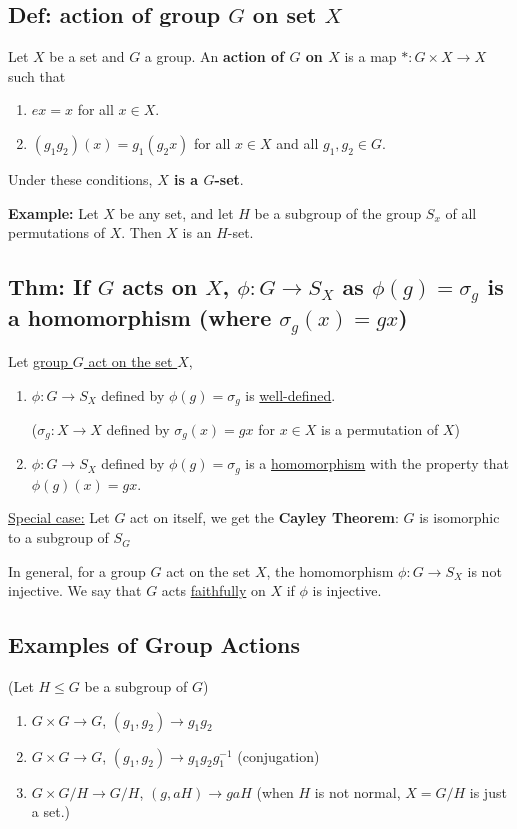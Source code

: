 \documentclass[11pt]{elegantbook}
\begin{document}
\subsection{Def: action of group $G$ on set $X$}
\begin{definition}
    Let $X$ be a set and $G$ a group. An \textbf{action of $G$ on $X$} is a map $*:G\times X \rightarrow	X$ such that
    \begin{enumerate}[(1)]
        \item $ex=x$ for all $x\in X$.
        \item $(g_1g_2)(x) = g_1(g_2x)$ for all $x \in X$ and all $g_1,g_2\in G$.
    \end{enumerate}
    Under these conditions, \textbf{$X$ is a $G$-set}.
\end{definition}

\textbf{Example:} Let $X$ be any set, and let $H$ be a subgroup of the group $S_x$ of all permutations of $X$. Then $X$ is an $H$-set.

\subsection{Thm: If $G$ acts on $X$, $\phi: G \rightarrow S_X$ as $\phi(g) = \sigma_g$ is a homomorphism (where $\sigma_g(x)=gx$)}
\begin{theorem}
Let \underline{group $G$ act on the set $X$},
\begin{enumerate}[$(1)$]
    \item $\phi: G \rightarrow S_X$ defined by $\phi(g) = \sigma_g$ is \underline{well-defined}.
    
    ($\sigma_g:X \rightarrow X$ defined by $\sigma_g(x)=gx$ for $x\in X$ is a permutation of $X$)
    \item $\phi: G \rightarrow S_X$ defined by $\phi(g) = \sigma_g$ is a \underline{homomorphism} with the property that $\phi(g)(x) = gx$.
\end{enumerate}
\end{theorem}
\underline{Special case:} Let $G$ act on itself, we get the \textbf{Cayley Theorem}: $G$ is isomorphic to a subgroup of $S_G$

In general, for a group $G$ act on the set $X$, the homomorphism $\phi:G \rightarrow S_X$ is not injective. We say that $G$ acts \underline{faithfully} on $X$ if $\phi$ is injective.

\subsection{Examples of Group Actions}
(Let $H \leq G$ be a subgroup of $G$)
\begin{enumerate}[$(1)$]
    \item $G\times G \rightarrow G$, $(g_1,g_2)\rightarrow g_1g_2$
    \item $G\times G \rightarrow G$, $(g_1,g_2)\rightarrow g_1g_2g_1^{-1}$ (conjugation)
    \item $G\times G/H \rightarrow G/H$, $(g,aH)\rightarrow gaH$ (when $H$ is not normal, $X=G/H$ is just a set.)
\end{enumerate}
\end{document}

